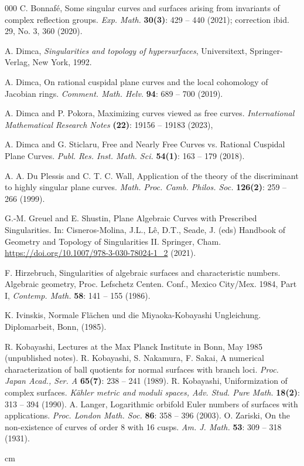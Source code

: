 \documentclass[11pt]{amsart}
\theoremstyle{plain}
\theoremstyle{definition}
\numberwithin{equation}{section}
\begin{document}
\begin{thebibliography}{000}
C. Bonnaf\'e, Some singular curves and surfaces arising from invariants of complex reflection groups. \textit{Exp. Math.} \textbf{30(3)}: 429 -- 440 (2021); correction ibid. 29, No. 3, 360 (2020).

A. Dimca, {\em Singularities and topology of hypersurfaces}, Universitext, Springer-Verlag, New York, 1992. 

A. Dimca,  On rational cuspidal plane curves and the local cohomology of Jacobian rings. \textit{Comment. Math. Helv.} \textbf{94}: 689 -- 700 (2019). 

A. Dimca and P. Pokora, Maximizing curves viewed as free curves. \textit{International Mathematical Research Notes} \textbf{(22)}: 19156 -- 19183 (2023),


 A. Dimca and G. Sticlaru, Free and Nearly Free Curves vs. Rational Cuspidal Plane Curves. \textit{Publ. Res. Inst. Math. Sci.} \textbf{54(1)}: 163 -- 179 (2018). 

A. A. Du Plessis and C. T. C. Wall, Application of the theory of the discriminant to highly singular plane curves. \textit{Math. Proc. Camb. Philos. Soc.} \textbf{126(2)}: 259 -- 266 (1999).

 G.-M. Greuel and E. Shustin, Plane Algebraic Curves with Prescribed Singularities. In: Cisneros-Molina, J.L., Lê, D.T., Seade, J. (eds) Handbook of Geometry and Topology of Singularities II. Springer, Cham. \url{https://doi.org/10.1007/978-3-030-78024-1_2} (2021).

F. Hirzebruch, Singularities of algebraic surfaces and characteristic numbers. Algebraic geometry, Proc. Lefschetz Centen. Conf., Mexico City/Mex. 1984, Part I, \textit{Contemp. Math.} \textbf{58}: 141 -- 155 (1986).

K. Ivinskis, Normale Fl\"{a}chen und die Miyaoka-Kobayashi Ungleichung. Diplomarbeit, Bonn, (1985).

R. Kobayashi, Lectures at the Max Planck Institute in Bonn, May 1985 (unpublished notes).
R. Kobayashi, S. Nakamura, F. Sakai, A numerical characterization of ball quotients for normal surfaces with branch loci. \textit{Proc. Japan Acad., Ser. A} \textbf{65(7)}: 238 -- 241 (1989).
R. Kobayashi, Uniformization of complex surfaces. \textit{Kähler metric and moduli spaces, Adv. Stud. Pure Math.} \textbf{18(2)}: 313 -- 394 (1990).
A. Langer, Logarithmic orbifold Euler numbers of surfaces with applications. \textit{Proc. London Math. Soc.} \textbf{86}: 358 -- 396 (2003).
O. Zariski, On the non-existence of curves of order 8 with 16 cusps. \textit{Am. J. Math.} \textbf{53}: 309 -- 318 (1931).
\end{thebibliography}
 cm
\end{document}
